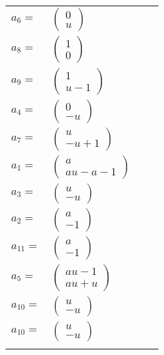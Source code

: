 \documentclass[1p]{elsarticle_modified}
\theoremstyle{definition}
\begin{document}
\begin{tabular}{m{7pt} m{180pt} m{7pt} m{180pt} }
\flushright $a_{6}=$&$\begin{pmatrix}0\\u\end{pmatrix}$ \\
\flushright $a_{8}=$&$\begin{pmatrix}1\\0\end{pmatrix}$ \\
\flushright $a_{9}=$&$\begin{pmatrix}1\\u-1\end{pmatrix}$ \\
\flushright $a_{4}=$&$\begin{pmatrix}0\\- u\end{pmatrix}$ \\
\flushright $a_{7}=$&$\begin{pmatrix}u\\- u+1\end{pmatrix}$ \\
\flushright $a_{1}=$&$\begin{pmatrix}a\\a u- a-1\end{pmatrix}$ \\
\flushright $a_{3}=$&$\begin{pmatrix}u\\- u\end{pmatrix}$ \\
\flushright $a_{2}=$&$\begin{pmatrix}a\\-1\end{pmatrix}$ \\
\flushright $a_{11}=$&$\begin{pmatrix}a\\-1\end{pmatrix}$ \\
\flushright $a_{5}=$&$\begin{pmatrix}a u-1\\a u+u\end{pmatrix}$ \\
\flushright $a_{10}=$&$\begin{pmatrix}u\\- u\end{pmatrix}$\\ \flushright $a_{10}=$&$\begin{pmatrix}u\\- u\end{pmatrix}$\\&\end{tabular}
\end{document}
